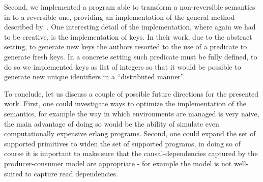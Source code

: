 \documentclass{article}[12pt,a4paper]
\theoremstyle{definition}
\begin{document}
Second, we implemented a program able to transform a non-reversible semantics in to a
reversible one, providing an implementation of the general method described
by~\cite{LaneseM20}. One interesting detail of the implementation, where again we had to be
creative, is the implementation of keys. In their work, due to the abstract
setting, to generate new keys the authors resorted to the use of a predicate
to generate fresh keys. In a concrete setting such predicate must be fully
defined, to do so we implemented keys as list of integers so that it would be
possible to generate new unique identifiers in a ``distributed manner''.

To conclude, let us discuss a couple of possible future directions for the presented
work. First, one could investigate ways to optimize the implementation of the
semantics, for example the way in which environments are managed is very naive,
the main advantage of doing so would be the ability of simulate even
computationally expensive erlang
programs. Second, one could expand the set of supported primitives to widen the
set of supported programs, in doing so of course it is important to make sure
that the causal-dependencies captured by the producer-consumer model are
appropriate - for example the model is not well-suited to capture read
dependencies.



\end{document}
